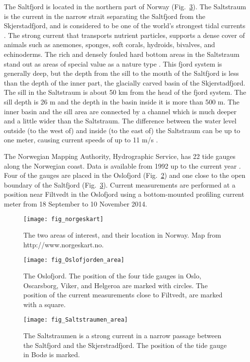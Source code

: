 The Saltfjord is located in the northern part of Norway (Fig.~\ref{fig:area2}). The Saltstraum is the current in the narrow strait separating the Saltfjord from the Skjerstadfjord, and is considered to be one of the world's strongest tidal currents \cite[]{gjevik09}. The strong current that transports nutrient particles, supports a dense cover of animals such as anemones, sponges, soft corals, hydroids, bivalves, and echinoderms. The rich and densely fouled hard bottom areas in the Saltstraum stand out as areas of special value as a nature type \cite[]{fagerli15}. This fjord system is generally deep, but the depth from the sill to the mouth of the Saltfjord is less than the depth of the inner part, the glacially carved basin of the Skjerstadfjord. The sill in the Saltstraum is about 50 km from the head of the fjord system. The sill depth is 26 m and the depth in the basin inside it is more than 500 m. The inner basin and the sill area are connected by a channel which is much deeper and a little wider than the Saltstraum. The difference between the water level outside (to the west of) and inside (to the east of) the Saltstraum can be up to one meter, causing current speeds of up to 11 m/s \cite[]{eliassen01}.

The Norwegian Mapping Authority, Hydrographic Service, has 22 tide gauges along the Norwegian coast. Data is available from 1992 up to the current year \cite[]{tide16}. Four of the gauges are placed in the Oslofjord  (Fig.~\ref{fig:area1}) and one close to the open boundary of the Saltfjord (Fig.~\ref{fig:area2}). Current measurements are performed at a position near Filtvedt in the Oslofjord using a bottom-mounted profiling current meter from 18 September to 10 November 2014.

\begin{figure}[!t]
\centering
\texttt{[image: fig\_norgeskart]}
\caption{The two areas of interest, and their location in Norway. Map from http://www.norgeskart.no.}
\label{fig:area0}
\end{figure}

\begin{figure}[!t]
\centering
\texttt{[image: fig\_Oslofjorden\_area]}
\caption{The Oslofjord. The position of the four tide gauges in Oslo, Oscarsborg, Viker, and Helgeroa are marked with circles. The position of the current measurements close to Filtvedt, are marked with a square.}
\label{fig:area1}
\end{figure}


\begin{figure}[!t]
\centering
\texttt{[image: fig\_Saltstraumen\_area]}
\caption{The Saltstraumen is a strong current in a narrow passage between the Saltfjord and the Skjerstradfjord. The position of the tide gauge in Bod{\o} is marked.}
\label{fig:area2}
\end{figure}
